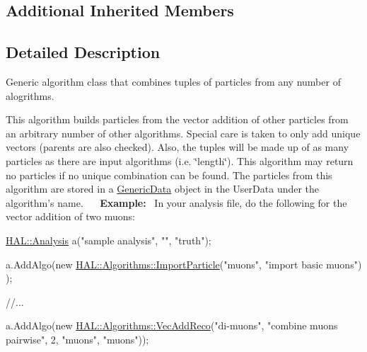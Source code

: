 \subsection*{Additional Inherited Members}


\subsection{Detailed Description}
Generic algorithm class that combines tuples of particles from any number of alogrithms. 

This algorithm builds particles from the vector addition of other particles from an arbitrary number of other algorithms. Special care is taken to only add unique vectors (parents are also checked). Also, the tuples will be made up of as many particles as there are input algorithms (i.\+e. \char`\"{}length\char`\"{}). This algorithm may return no particles if no unique combination can be found. The particles from this algorithm are stored in a \hyperlink{class_h_a_l_1_1_generic_data}{Generic\+Data} object in the User\+Data under the algorithm's name.~\newline
~\newline
{\bfseries Example\+:}~\newline
In your analysis file, do the following for the vector addition of two muons\+:


\begin{DoxyCode}
\hyperlink{class_h_a_l_1_1_analysis}{HAL::Analysis} a(\textcolor{stringliteral}{"sample analysis"}, \textcolor{stringliteral}{""}, \textcolor{stringliteral}{"truth"});

a.AddAlgo(\textcolor{keyword}{new} \hyperlink{class_h_a_l_1_1_algorithms_1_1_import_particle}{HAL::Algorithms::ImportParticle}(\textcolor{stringliteral}{"muons"}, \textcolor{stringliteral}{"import basic muons"})
      );

\textcolor{comment}{//...}

a.AddAlgo(\textcolor{keyword}{new} \hyperlink{class_h_a_l_1_1_algorithms_1_1_vec_add_reco}{HAL::Algorithms::VecAddReco}(\textcolor{stringliteral}{"di-muons"}, \textcolor{stringliteral}{"combine muons pairwise"}, 
                                          2,
                                          \textcolor{stringliteral}{"muons"}, \textcolor{stringliteral}{"muons"}));
\end{DoxyCode}
 


